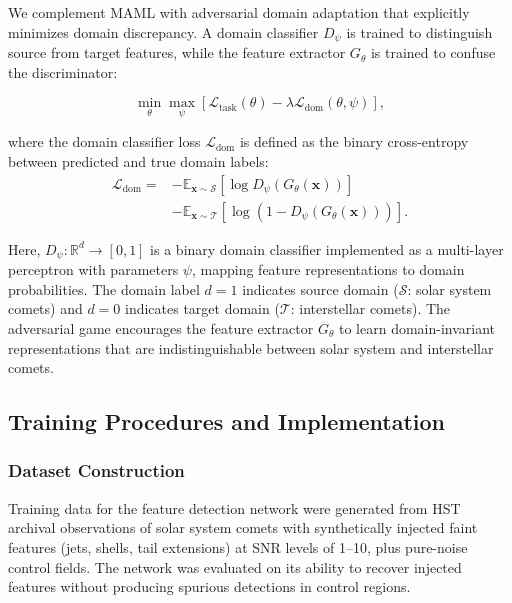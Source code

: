 \documentclass[preprint2]{aastex631}
\begin{document}
We complement MAML with adversarial domain adaptation \citep{ganin16} that explicitly minimizes domain discrepancy. A domain classifier $D_\psi$ is trained to distinguish source from target features, while the feature extractor $G_\theta$ is trained to confuse the discriminator:

\begin{equation}\label{eq:adv_loss}
\min_\theta \max_\psi \left[ \mathcal{L}_{\text{task}}(\theta) - \lambda \mathcal{L}_{\text{dom}}(\theta, \psi) \right],
\end{equation}

where the domain classifier loss $\mathcal{L}_{\text{dom}}$ is defined as the binary cross-entropy between predicted and true domain labels:
\begin{equation}\label{eq:dom_loss}
\begin{split}
\mathcal{L}_{\text{dom}} ={} &
    -\mathbb{E}_{\mathbf{x} \sim \mathcal{S}}[\log D_\psi(G_\theta(\mathbf{x}))] \\
    &-\mathbb{E}_{\mathbf{x} \sim \mathcal{T}}[\log(1 - D_\psi(G_\theta(\mathbf{x})))].
\end{split}
\end{equation}

Here, $D_\psi: \mathbb{R}^d \rightarrow [0,1]$ is a binary domain classifier implemented as a multi-layer perceptron with parameters $\psi$, mapping feature representations to domain probabilities. The domain label $d=1$ indicates source domain ($\mathcal{S}$: solar system comets) and $d=0$ indicates target domain ($\mathcal{T}$: interstellar comets). The adversarial game encourages the feature extractor $G_\theta$ to learn domain-invariant representations that are indistinguishable between solar system and interstellar comets.

\subsection{Training Procedures and Implementation}

\subsubsection{Dataset Construction}

Training data for the feature detection network were generated from HST archival observations of solar system comets with synthetically injected faint features (jets, shells, tail extensions) at SNR levels of 1--10, plus pure-noise control fields. The network was evaluated on its ability to recover injected features without producing spurious detections in control regions.
\end{document}
